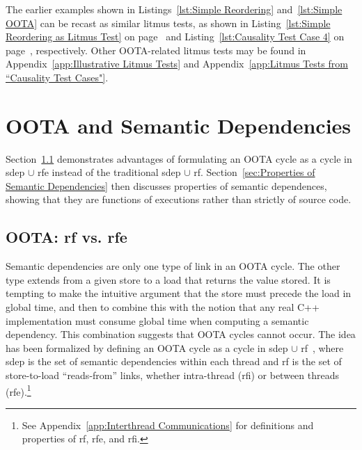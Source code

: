 \documentclass[10]{article}
\begin{document}
The earlier examples shown in
Listings~\ref{lst:Simple Reordering}
and~\ref{lst:Simple OOTA}
can be recast as similar  litmus tests, as shown in
Listing~\ref{lst:Simple Reordering as Litmus Test}
on page~\pageref{lst:Simple Reordering as Litmus Test}
and Listing~\ref{lst:Causality Test Case 4}
on page~\pageref{lst:Causality Test Case 4}, respectively.
Other OOTA-related litmus tests may be found in
Appendix~\ref{app:Illustrative Litmus Tests}
and
Appendix~\ref{app:Litmus Tests from “Causality Test Cases"}.

\section{OOTA and Semantic Dependencies}
\label{sec:OOTA and Semantic Dependencies}

Section~\ref{sec:OOTA: rf vs. rfe}
demonstrates advantages of formulating an OOTA cycle as a cycle in
sdep $\cup$ rfe instead of the traditional sdep $\cup$ rf.
Section~\ref{sec:Properties of Semantic Dependencies}
then discusses properties of semantic dependences, showing that they
are functions of executions rather than strictly of source code.

\subsection{OOTA: rf vs. rfe}
\label{sec:OOTA: rf vs. rfe}

Semantic dependencies are only one type of link in an OOTA cycle.
The other type extends from a given store to a load that returns the
value stored.
It is tempting to make the intuitive argument that the store must precede
the load in global time, and then to combine this with the notion that
any real C++ implementation must consume global time when computing a
semantic dependency.
This combination suggests that OOTA cycles cannot occur.
The idea has been formalized by defining an OOTA cycle as a cycle
in sdep $\cup$ rf~\cite{PaulEMcKenney2014OOTA},
where sdep is the set of semantic dependencies within
each thread and rf is the set of store-to-load ``reads-from'' links,
whether intra-thread
(rfi) or between threads (rfe).\footnote{
	See Appendix~\ref{app:Interthread Communications} for definitions
	and properties of rf, rfe, and rfi.}
\end{document}
